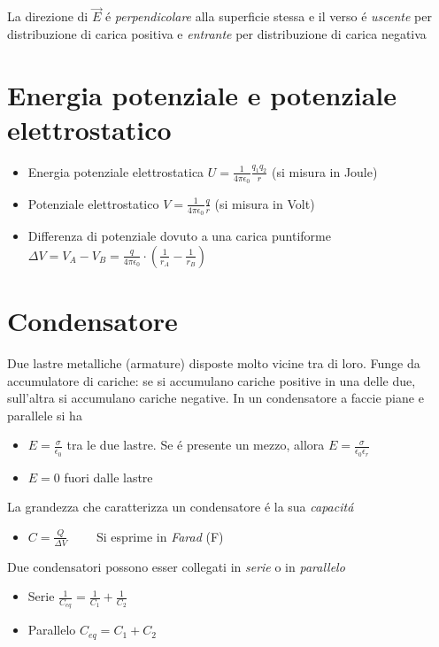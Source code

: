 \documentclass[17pt]{article}
\begin{document}
La direzione di $\vec{E}$ \'e \emph{perpendicolare} alla superficie stessa e il verso \'e \emph{uscente} per distribuzione di carica positiva e \emph{entrante} per distribuzione di carica negativa


\section{Energia potenziale e potenziale elettrostatico}



\begin{itemize}
	\item Energia potenziale elettrostatica $U = \frac{1}{4\pi\epsilon_0}\frac{q_1q_2}{r}$ (si misura in Joule)
	\item Potenziale elettrostatico $V = \frac{1}{4\pi\epsilon_0}\frac{q}{r}$ (si misura in Volt)
	\item Differenza di potenziale dovuto a una carica puntiforme $\Delta V = V_A - V_B = \frac{q}{4\pi\epsilon_0}\cdot\left( \frac{1}{r_A} - \frac{1}{r_B} \right)$ 
\end{itemize}


\section{Condensatore}

Due lastre metalliche (armature) disposte molto vicine tra di loro. Funge da accumulatore di cariche: se si accumulano cariche positive in una delle due, sull'altra si accumulano cariche negative. In un condensatore a faccie piane e parallele si ha 

\begin{itemize}
	\item $E = \frac{\sigma}{\epsilon_0}$ tra le due lastre. Se \'e presente un mezzo, allora $E = \frac{\sigma}{\epsilon_0\epsilon_r}$
	\item $E = 0$ fuori dalle lastre
\end{itemize}


La grandezza che caratterizza un condensatore \'e la sua \emph{capacit\'a}

\begin{itemize}
	\item $C = \frac{Q}{\Delta V}\qquad$ Si esprime in \emph{Farad} (F)
\end{itemize}


Due condensatori possono esser collegati in \emph{serie} o in \emph{parallelo}

\begin{itemize}
	\item Serie $\frac{1}{C_{eq}} = \frac{1}{C_1} + \frac{1}{C_2}$
	\item Parallelo $C_{eq} = C_1 + C_2$
\end{itemize}
\end{document}
